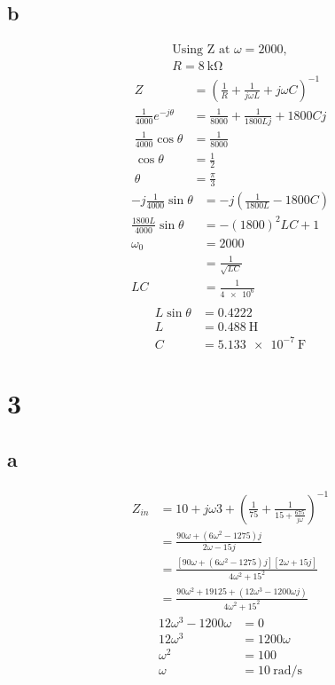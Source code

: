 \documentclass{article}
\begin{document}
\begin{multicols}{2}
\subsection*{b}
\begin{align*}
\text{Using Z at } \omega = 2000,\\
R= \boxed{\SI{8}{\kilo\ohm}}
\end{align*}
\begin{align*}
    Z&=\left( \frac{1}{R} + \frac{1}{j \omega L} + j \omega C \right) ^{-1}\\
    \frac{1}{4000} e^{-j \theta} &= \frac{1}{8000} + \frac{1}{1800 L j} + 1800 C j\\
    \frac{1}{4000} \cos \theta &= \frac{1}{8000}\\
    \cos\theta &= \frac{1}{2}\\
    \theta &= \frac{\pi}{3}
\end{align*}
\begin{align*}
    -j\frac{1}{4000} \sin\theta &= -j\left( \frac{1}{1800L} - 1800 C\right)\\
    \frac{1800L}{4000} \sin\theta &= -(1800)^2 LC + 1\\
    \omega_0 &= 2000\\
    &= \frac{1}{\sqrt{LC}}\\
    LC&= \frac{1}{\num{4e6}}\\
\end{align*}
\begin{align*}
    L\sin\theta &= 0.4222\\
    L &= \boxed{\SI{0.488}{\henry}}\\
    C &= \boxed{\SI{5.133e-7}{\farad}}
\end{align*}

\section*{3}
\subsection*{a}
\begin{align*}
    Z_{in} &= 10 + j\omega 3 + \left( \frac{1}{75} + \frac{1}{15 + \frac{675}{j\omega}} \right) ^{-1}\\
    &= \frac{90\omega + (6 \omega^2 - 1275)j}{2\omega - 15j}\\
    &= \frac{\left[ 90\omega + (6 \omega^2 - 1275)j \right] [2\omega + 15j]}{4\omega^2 + 15^2}\\
    &= \frac{90\omega^2 +19125 + \left( 12\omega^3 -1200 \omega j \right)}{4\omega^2 + 15^2}
\end{align*}
\begin{align*}
    12\omega^3-1200\omega &= 0\\
    12\omega^3 &= 1200\omega\\
    \omega^2 &= 100\\
    \omega &= \boxed{\SI{10}{\radian\per\second}}
\end{align*}


\end{multicols}
\end{document}
